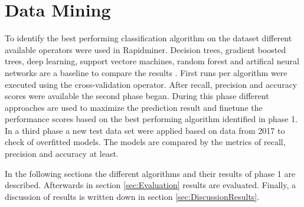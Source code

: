 \section{Data Mining}

To identify the best performing classification algorithm on the dataset different available operators were used in Rapidminer. Decision trees, gradient boosted trees, deep learning, support vectore machines, random forest and artifical neural networks are a baseline to compare the results .
First runs per algorithm were executed using the cross-validation operator. After recall, precision and accuracy scores were available the second phase began. During this phase different approaches are used to maximize the prediction result and finetune the performance scores based on the best performing algorithm identified in phase 1. In a third phase a new test data set were applied based on data from 2017 to check of overfitted models. The models are compared by the metrics of recall, precision and accuracy  at least.\newline

In the following sections the different algorithms and their results of phase 1 are described. 
Afterwards in section \ref{sec:Evaluation} results are evaluated.
Finally, a discussion of results is written down in section \ref{sec:DiscussionResults}. 









